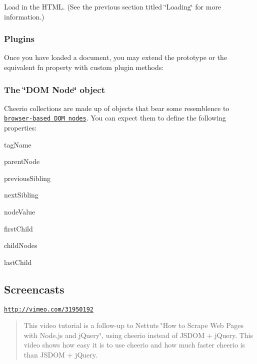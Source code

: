 Load in the H\+T\+ML. (See the previous section titled \char`\"{}\+Loading\char`\"{} for more information.)

\subsubsection*{Plugins}

Once you have loaded a document, you may extend the prototype or the equivalent {\ttfamily fn} property with custom plugin methods\+:




\subsubsection*{The \char`\"{}\+D\+O\+M Node\char`\"{} object}

Cheerio collections are made up of objects that bear some resemblence to \href{https://developer.mozilla.org/en-US/docs/Web/API/Node}{\tt browser-\/based D\+OM nodes}. You can expect them to define the following properties\+:


\begin{DoxyItemize}
\item {\ttfamily tag\+Name}
\item {\ttfamily parent\+Node}
\item {\ttfamily previous\+Sibling}
\item {\ttfamily next\+Sibling}
\item {\ttfamily node\+Value}
\item {\ttfamily first\+Child}
\item {\ttfamily child\+Nodes}
\item {\ttfamily last\+Child}
\end{DoxyItemize}

\subsection*{Screencasts}

\href{http://vimeo.com/31950192}{\tt http\+://vimeo.\+com/31950192}

\begin{quote}
This video tutorial is a follow-\/up to Nettut\textquotesingle{}s \char`\"{}\+How to Scrape Web Pages with Node.\+js and j\+Query\char`\"{}, using cheerio instead of J\+S\+D\+OM + j\+Query. This video shows how easy it is to use cheerio and how much faster cheerio is than J\+S\+D\+OM + j\+Query. \end{quote}



